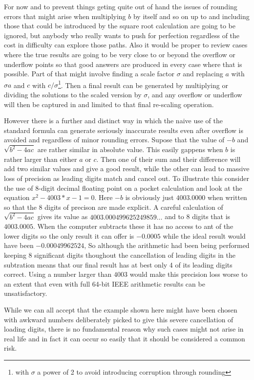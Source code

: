 For now and to prevent things geting quite out of hand the issues of
rounding errors that might arise when multiplying $b$ by itself and so
on up to and including those that could be introduced by the square root
calculation are going to be ignored, but anybody who really wants to
push for perfection regardless of the cost in difficulty can explore
those paths. Also it would be proper to review cases where the true
results are going to be very close to or beyond the overflow or underflow
points so that good answers are produced in every case where that is possible.
Part of that might involve finding a scale factor $\sigma$ and replacing $a$
with $\sigma a$ and $c$ with $c / \sigma$\footnote{with $\sigma$ a power of
2 to avoid introducing corruption through rounding}. Then a final result
can be generated by multiplying or dividing the solutions to the
scaled version by $\sigma$, and any overflow or underflow will then
be captured in and limited to that final re-scaling operation.

However there is a further and distinct way in which the naive use of the
standard formula can generate seriously inaccurate results even after
overflow is avoided and regardless of minor rounding errors.
Supose that the value of $-b$ and $\sqrt{b^2 - 4 a c}$ are rather similar
in absolute value. This easily gappens when $b$ is rather larger than
either $a$ or $c$. Then one of their sum and their difference will
add two similar values and give a good result, while the other can lead
to massive loss of precision as leading digits match and cancel out. To
illustrate this consider the use of 8-digit decimal floating point on
a pocket calculation and look at the equation $x^2 - 4003*x -1 = 0$.
Here $-b$ is obviously just $4003.0000$ when written so that the 8
digits of precison are made explicit. A careful  calculation of
$\sqrt{b^2 - 4 a c}$ gives its value as $4003.000499625249859\ldots$ and
to 8 digits that is $4003.0005$. When the computer subtracts these it has
no access to ant of the lower digits so the only result it can offer
is $-0.0005$ while the ideal result would have been $-0.00049962524$, So
although the arithmetic had been being performed keeping 8 significant
digits thoughout the cancellation of leading digits in the subtration
means that our final result has at best only 4 of its leading digits
correct. Using a number larger than $4003$ would make this precision loss
worse to an extent that even with full 64-bit IEEE arithmetic results
can be unsatisfactory.


While we can all accept that the example shown here might have been chosen
with awkward numbers deliberately picked to give this severe cancellation
of loading digits, there is no fundamental reason why such cases might not
arise in real life and in fact it can occur so easily that it should be
considered a common risk.

